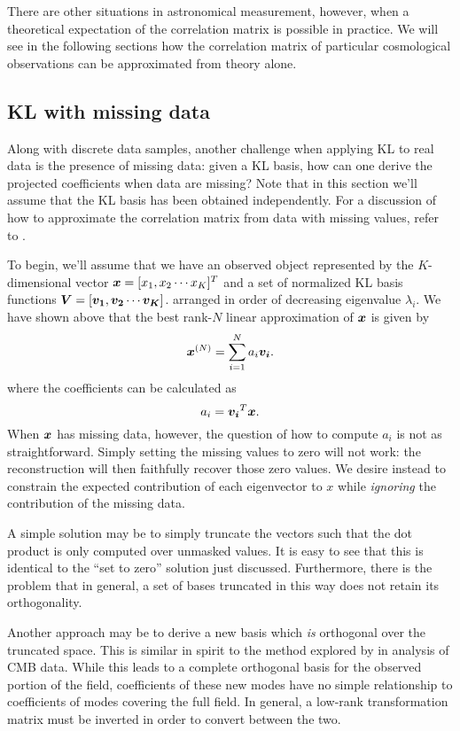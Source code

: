 There are other situations in astronomical measurement, however, when a
theoretical expectation of the correlation matrix is possible in practice.
We will see in the following sections how the correlation matrix of
particular cosmological observations can be approximated from theory alone.


\subsection{KL with missing data}
Along with discrete data samples, another challenge when applying KL to
real data is the presence of missing data: given a KL basis, how can
one derive the projected coefficients when data are missing?
Note that in this section we'll assume that the KL basis has been
obtained independently.  For a discussion of how to approximate the
correlation matrix from data with missing values, refer to \citet{Yip04a}.

To begin, we'll assume that we have
an observed object represented by the $K$-dimensional vector 
$\boldsymbol{x} = [x_1, x_2 \cdots x_K]^T$ and a set of normalized
KL basis functions 
$\boldsymbol{V} = [\boldsymbol{v_1}, \boldsymbol{v_2} \cdots \boldsymbol{v_K}]$.
arranged in order of decreasing eigenvalue $\lambda_i$.  We have shown above
that the best rank-$N$ linear approximation of $\boldsymbol{x}$ is given by
\begin{equation}
  \boldsymbol{x}^{(N)} = \sum_{i=1}^{N}a_i\boldsymbol{v_i}.
\end{equation}
where the coefficients can be calculated as
\begin{equation}
  \label{eq:a_coeff_def}
  a_i = \boldsymbol{v_i}^T\boldsymbol{x}.
\end{equation}
When $\boldsymbol{x}$ has missing data,
however, the question of how to compute $a_i$ is not as straightforward.
Simply setting the missing values to zero
will not work: the reconstruction will then faithfully recover those
zero values.  We desire instead to constrain the expected contribution
of each eigenvector to $x$ while {\it ignoring} the contribution of the
missing data.

A simple solution may be to simply truncate the vectors such that the dot
product is only computed over unmasked values.  It is easy to see that this
is identical to the  ``set to zero'' solution just
discussed.  Furthermore, there is the problem that in general, a set
of bases truncated in this way does not retain its orthogonality.

Another approach may be to derive a new basis which {\it is} orthogonal
over the truncated space.  This is similar in spirit to the method
explored by \citet{Gorski1994} in analysis of CMB data.
While this leads to a complete orthogonal basis for the observed portion
of the field, coefficients of these new modes have no simple relationship to
coefficients of modes covering the full field.  In general, a low-rank
transformation matrix must be inverted in order to convert between the two.

